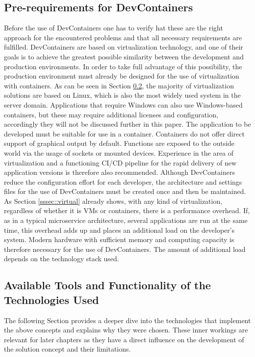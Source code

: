 \documentclass[12pt, a4paper]{article}
\begin{document}
    \subsection{Pre-requirements for DevContainers}
    Before the use of DevContainers one has to verify hat these are the right approach for the encountered problems and that all necessary requirements are fulfilled.\newline
    DevContainers are based on virtualization technology, and one of their goals is to achieve the greatest possible similarity between the development and production environments. In order to take full advantage of this possibility, the production environment must already be designed for the use of virtualization with containers.  As can be seen in Section \ref{ssec::toolsused}, the majority of virtualization solutions are based on Linux, which is also the most widely used system in the server domain. Applications that require Windows can also use Windows-based containers, but these may require additional licenses and configuration, accordingly they will not be discussed further in this paper. The application to be developed must be suitable for use in a container. Containers do not offer direct support of graphical output by default. Functions are exposed to the outside world via the usage of sockets or mounted devices. Experience in the area of virtualization and a functioning \ac{CI}/\ac{CD} pipeline for the rapid delivery of new application versions is therefore also recommended.\newline
    Although DevContainers reduce the configuration effort for each developer, the architecture and settings files for the use of DevContainers must be created once and then be maintained. As Section \ref{sssec::virtual} already shows, with any kind of virtualization, regardless of whether it is VMs or containers, there is a performance overhead. If, as in a typical microservice architecture, several applications are run at the same time, this overhead adds up and places an additional load on the developer's system. Modern hardware with sufficient memory and computing capacity is therefore necessary for the use of DevContainers. The amount of additional load depends on the technology stack used.

    \subsection{Available Tools and Functionality of the Technologies Used}\label{ssec::toolsused}
    The following Section provides a deeper dive into the technologies that implement the above concepts and explains why they were chosen. These inner workings are relevant for later chapters as they have a direct influence on the development of the solution concept and their limitations.
\end{document}
